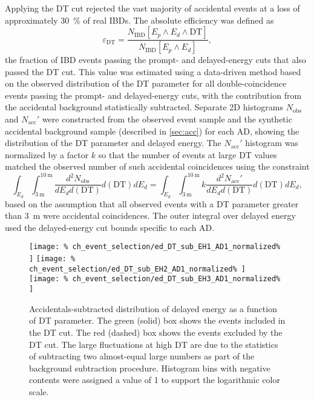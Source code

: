 Applying the DT cut rejected the vast majority of accidental events
at a loss of approximately \SI{30}{\percent} of real IBDs.
The absolute efficiency was defined as
\begin{equation}\label{eq:abs_DT_eff}
    \varepsilon_{\text{DT}} = \frac{
        N_\text{IBD}[E_p \wedge E_d \wedge \text{DT}]
    }%
    {
        N_\text{IBD}[E_p \wedge E_d]
    },
\end{equation}
the fraction of IBD events passing the prompt- and delayed-energy cuts
that also passed the DT cut.
This value was estimated using a data-driven method
based on the observed distribution of the DT parameter
for all double-coincidence events passing the prompt- and delayed-energy cuts,
with the contribution from the accidental background
statistically subtracted.
Separate 2D histograms $N_\text{obs}$ and $N_\text{acc}'$
were constructed from the observed event sample
and the synthetic accidental background sample (described in \cref{sec:acc}) for each AD,
showing the distribution of the DT parameter and delayed energy.
The $N_\text{acc}'$ histogram was normalized by a factor $k$ so that
the number of events at large DT values
matched the observed number of such accidental coincidences
using the constraint
\begin{equation}\label{eq:acc_sub_normalized}
    \int_{E_d}\int_{\SI{3}{\m}}^{\SI{10}{\m}}
    \frac{d^2N_\text{obs}}{dE_d d(\text{DT})}
    d(\text{DT}) dE_d
    =
    \int_{E_d}\int_{\SI{3}{\m}}^{\SI{10}{\m}}
    k\frac{d^2N_\text{acc}'}{dE_d d(\text{DT})}
    d(\text{DT}) dE_d,
\end{equation}
based on the assumption that all observed events
with a DT parameter greater than \SI{3}{\m}
were accidental coincidences.
The outer integral over delayed energy
used the delayed-energy cut bounds specific to each AD.

\begin{figure}
    \centering
    \texttt{[image: \%
        ch\_event\_selection/ed\_DT\_sub\_EH1\_AD1\_normalized\%
    ]}
    \texttt{[image: \%
        ch\_event\_selection/ed\_DT\_sub\_EH2\_AD1\_normalized\%
    ]} \\
    \texttt{[image: \%
        ch\_event\_selection/ed\_DT\_sub\_EH3\_AD1\_normalized\%
    ]}
    \caption[Delayed energy vs. DT without accidentals]{
        Accidentals-subtracted distribution of
        delayed energy as a function of DT parameter.
        The green (solid) box shows the events included in the DT cut.
        The red (dashed) box shows the events excluded by the DT cut.
        The large fluctuations at high DT are due to the statistics
        of subtracting two almost-equal large numbers as part of the
        background subtraction procedure.
        Histogram bins with negative contents were assigned a value of 1
        to support the logarithmic color scale.
    }
    \label{fig:ed_DT_sub}
\end{figure}

